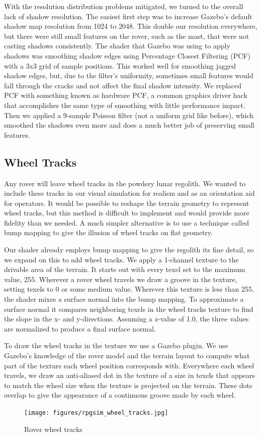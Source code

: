 \documentclass[twocolumn,letterpaper]{IEEEAerospaceCLS}  %
\begin{document}
With the resolution distribution problems mitigated, we turned to the overall lack of shadow resolution. The easiest first step was to increase Gazebo's default shadow map resolution from 1024 to 2048. This double our resolution everywhere, but there were still small features on the rover, such as the mast, that were not casting shadows consistently. The shader that Gazebo was using to apply shadows was smoothing shadow edges using Percentage Closest Filtering (PCF) with a 3x3 grid of sample positions. This worked well for smoothing jagged shadow edges, but, due to the filter's uniformity, sometimes small features would fall through the cracks and not affect the final shadow intensity. We replaced PCF with something known as hardware PCF, a common graphics driver hack that accomplishes the same type of smoothing with little performance impact. Then we applied a 9-sample Poisson filter (not a uniform grid like before), which smoothed the shadows even more and does a much better job of preserving small features.

\subsection{Wheel Tracks}
Any rover will leave wheel tracks in the powdery lunar regolith. We wanted to include these tracks in our visual simulation for realism and as an orientation aid for operators. It would be possible to reshape the terrain geometry to represent wheel tracks, but this method is difficult to implement and would provide more fidelity than we needed. A much simpler alternative is to use a technique called bump mapping to give the illusion of wheel tracks on flat geometry.

Our shader already employs bump mapping to give the regolith its fine detail, so we expand on this to add wheel tracks. We apply a 1-channel texture to the drivable area of the terrain. It starts out with every texel set to the maximum value, 255. Wherever a rover wheel travels we draw a groove in the texture, setting texels to 0 or some medium value. Wherever this texture is less than 255, the shader mixes a surface normal into the bump mapping. To approximate a surface normal it compares neighboring texels in the wheel tracks texture to find the slope in the x- and y-directions. Assuming a z-value of 1.0, the three values are normalized to produce a final surface normal.

To draw the wheel tracks in the texture we use a Gazebo plugin. We use Gazebo's knowledge of the rover model and the terrain layout to compute what part of the texture each wheel position corresponds with. Everywhere each wheel travels, we draw an anti-aliased dot in the texture of a size in texels that appears to match the wheel size when the texture is projected on the terrain. These dots overlap to give the appearance of a continuous groove made by each wheel.
\begin{figure}[h!]
	\texttt{[image: figures/rpgsim\_wheel\_tracks.jpg]}
   	\caption{Rover wheel tracks}
    \label{fig:wheeltracks}
\end{figure}
\end{document}

